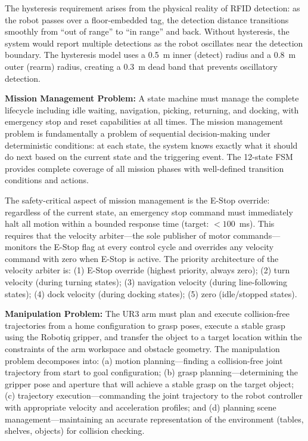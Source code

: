 \documentclass[12pt,a4paper,oneside]{report}
\begin{document}
The hysteresis requirement arises from the physical reality of RFID detection: as the robot passes over a floor-embedded tag, the detection distance transitions smoothly from ``out of range'' to ``in range'' and back. Without hysteresis, the system would report multiple detections as the robot oscillates near the detection boundary. The hysteresis model uses a 0.5~m inner (detect) radius and a 0.8~m outer (rearm) radius, creating a 0.3~m dead band that prevents oscillatory detection.

\textbf{Mission Management Problem:} A state machine must manage the complete lifecycle including idle waiting, navigation, picking, returning, and docking, with emergency stop and reset capabilities at all times. The mission management problem is fundamentally a problem of sequential decision-making under deterministic conditions: at each state, the system knows exactly what it should do next based on the current state and the triggering event. The 12-state FSM provides complete coverage of all mission phases with well-defined transition conditions and actions.

The safety-critical aspect of mission management is the E-Stop override: regardless of the current state, an emergency stop command must immediately halt all motion within a bounded response time (target: $<100$~ms). This requires that the velocity arbiter---the sole publisher of motor commands---monitors the E-Stop flag at every control cycle and overrides any velocity command with zero when E-Stop is active. The priority architecture of the velocity arbiter is: (1) E-Stop override (highest priority, always zero); (2) turn velocity (during turning states); (3) navigation velocity (during line-following states); (4) dock velocity (during docking states); (5) zero (idle/stopped states).

\textbf{Manipulation Problem:} The UR3 arm must plan and execute collision-free trajectories from a home configuration to grasp poses, execute a stable grasp using the Robotiq gripper, and transfer the object to a target location within the constraints of the arm workspace and obstacle geometry. The manipulation problem decomposes into: (a) motion planning---finding a collision-free joint trajectory from start to goal configuration; (b) grasp planning---determining the gripper pose and aperture that will achieve a stable grasp on the target object; (c) trajectory execution---commanding the joint trajectory to the robot controller with appropriate velocity and acceleration profiles; and (d) planning scene management---maintaining an accurate representation of the environment (tables, shelves, objects) for collision checking.
\end{document}
